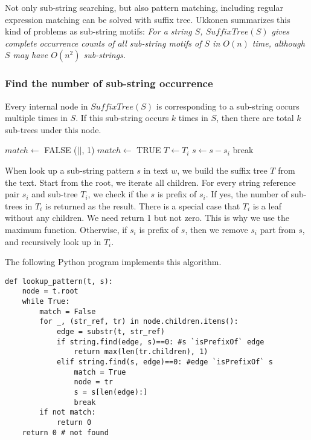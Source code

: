 \documentclass{article}
\begin{document}
Not only sub-string searching, but also pattern matching, including
regular expression matching can be solved with suffix tree. Ukkonen
summarizes this kind of problems as sub-string motifs:
{\em For a string $S$, $SuffixTree(S)$ gives complete occurrence
counts of all sub-string motifs of $S$ in $O(n)$ time, although $S$ may have
$O(n^2)$ sub-strings.}

\subsubsection{Find the number of sub-string occurrence}

Every internal node in $SuffixTree(S)$ is corresponding
to a sub-string occurs multiple times in $S$. If this sub-string occurs
$k$ times in $S$, then there are total $k$ sub-trees under this node\cite{ukkonen-lec}.

\begin{algorithmic}[1]
  \Loop
    \State $match \gets$ FALSE
        \State \Return {}($|$$|$, 1)
        \State $match \gets$ TRUE
        \State $T \gets T_i$
        \State $s \gets s - s_i$
        \State break
      \EndIf
    \EndFor
      \State {}
    \EndIf
  \EndLoop
\EndFunction
\end{algorithmic}

When look up a sub-string pattern $s$ in text $w$, we build the suffix tree $T$ from the
text. Start from the root, we iterate all children. For every
string reference pair $s_i$ and sub-tree $T_i$, we check if the $s$ is prefix of $s_i$.
If yes, the number of sub-trees in $T_i$ is returned as the result.
There is a special case that $T_i$ is a leaf without any children. We need return 1 but
not zero. This is why we use the maximum function.
Otherwise, if $s_i$ is prefix of $s$, then we remove $s_i$ part from $s$, and recursively
look up in $T_i$.

The following Python program implements this algorithm.

\lstset{language=Python}
\begin{lstlisting}
def lookup_pattern(t, s):
    node = t.root
    while True:
        match = False
        for _, (str_ref, tr) in node.children.items():
            edge = substr(t, str_ref)
            if string.find(edge, s)==0: #s `isPrefixOf` edge
                return max(len(tr.children), 1)
            elif string.find(s, edge)==0: #edge `isPrefixOf` s
                match = True
                node = tr
                s = s[len(edge):]
                break
        if not match:
            return 0
    return 0 # not found
\end{lstlisting}
\end{document}
